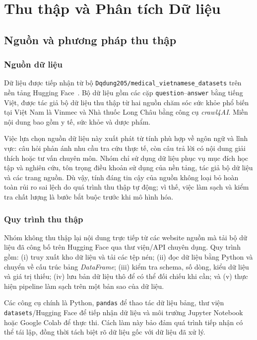 \documentclass[12pt,a4paper,oneside]{report}
\begin{document}
\chapter{Thu thập và Phân tích Dữ liệu}
\label{chap:data}

\section{Nguồn và phương pháp thu thập}
\subsection{Nguồn dữ liệu}
Dữ liệu được tiếp nhận từ bộ \texttt{Dqdung205/medical\_vietnamese\_datasets} trên nền tảng Hugging Face~\cite{medical-vietnamese-dataset}. Bộ dữ liệu gồm các cặp \texttt{question}--\texttt{answer} bằng tiếng Việt, được tác giả bộ dữ liệu thu thập từ hai nguồn chăm sóc sức khỏe phổ biến tại Việt Nam là Vinmec và Nhà thuốc Long Châu bằng công cụ \textit{crawl4AI}. Miền nội dung bao gồm y tế, sức khỏe và dược phẩm.

Việc lựa chọn nguồn dữ liệu này xuất phát từ tính phù hợp về ngôn ngữ và lĩnh vực: câu hỏi phản ánh nhu cầu tra cứu thực tế, còn câu trả lời có nội dung giải thích hoặc tư vấn chuyên môn. Nhóm chỉ sử dụng dữ liệu phục vụ mục đích học tập và nghiên cứu, tôn trọng điều khoản sử dụng của nền tảng, tác giả bộ dữ liệu và các trang nguồn. Dù vậy, tính đáng tin cậy của nguồn không loại bỏ hoàn toàn rủi ro sai lệch do quá trình thu thập tự động; vì thế, việc làm sạch và kiểm tra chất lượng là bước bắt buộc trước khi mô hình hóa.

\subsection{Quy trình thu thập}
Nhóm không thu thập lại nội dung trực tiếp từ các website nguồn mà tải bộ dữ liệu đã công bố trên Hugging Face qua thư viện/API chuyên dụng. Quy trình gồm: (i) truy xuất kho dữ liệu và tải các tệp nén; (ii) đọc dữ liệu bằng Python và chuyển về cấu trúc bảng \textit{DataFrame}; (iii) kiểm tra schema, số dòng, kiểu dữ liệu và giá trị thiếu; (iv) lưu bản dữ liệu thô để có thể đối chiếu khi cần; và (v) thực hiện pipeline làm sạch trên một bản sao của dữ liệu.

Các công cụ chính là Python, \texttt{pandas} để thao tác dữ liệu bảng, thư viện \texttt{datasets}/Hugging Face để tiếp nhận dữ liệu và môi trường Jupyter Notebook hoặc Google Colab để thực thi. Cách làm này bảo đảm quá trình tiếp nhận có thể tái lập, đồng thời tách biệt rõ dữ liệu gốc với dữ liệu đã xử lý.
\end{document}
